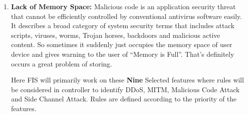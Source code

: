\begin{enumerate}
\item \textbf{Lack of Memory Space: }Malicious code is an application security threat that cannot be efficiently controlled by conventional antivirus software easily. It describes a broad category of system security terms that includes attack scripts, viruses, worms, Trojan horses, backdoors and malicious active content. So sometimes it suddenly just occupies the memory space of user device and gives warning to the user of “Memory is Full”. That’s definitely occurs a great problem of storing.

Here FIS will primarily work on these \textbf{Nine} Selected features where rules will be considered in controller to identify DDoS, MITM, Malicious Code Attack and Side Channel Attack. Rules are defined according to the priority of the features.
\end{enumerate}


